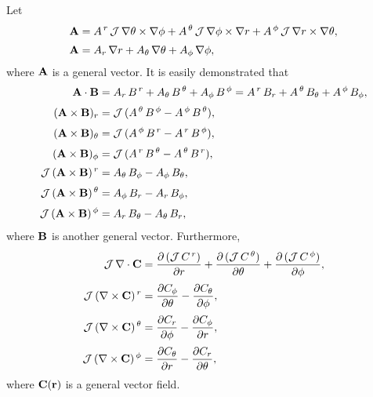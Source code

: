 \documentclass[12pt,prb,aps]{revtex4-1}
\begin{document}
Let
\begin{align}
{\bf A} &= A^{\,r}\,{\cal J}\,\nabla\theta\times\nabla\phi
+  A^{\,\theta}\,{\cal J}\,\nabla\phi\times\nabla r
+  A^{\,\phi}\,{\cal J}\,\nabla r\times\nabla\theta,\\[0.5ex]
{\bf A} &= A_r\,\nabla r+A_\theta\,\nabla\theta+A_\phi\,\nabla\phi,
\end{align}
where ${\bf A}$ is a general vector.
It is easily demonstrated that
\begin{align}
{\bf A}\cdot{\bf B} &= A_r\,B^{\,r}+A_\theta \,B^{\,\theta}+A_\phi\,B^{\,\phi}=A^{\,r}\,B_r+A^{\,\theta}\,B_{\theta}+A^{\,\phi}\,B_\phi,\\[0.5ex]
({\bf A}\times {\bf B})_r &= {\cal J}\,(A^{\,\theta}\,B^{\,\phi}-A^{\,\phi}\,B^{\,\theta}),\label{crossdown1}\\[0.5ex]
({\bf A}\times {\bf B})_\theta &= {\cal J}\,(A^{\,\phi}\,B^{\,r}-A^{\,r}\,B^{\,\phi}),\label{crossdown2}\\[0.5ex]
({\bf A}\times {\bf B})_\phi &= {\cal J}\,(A^{\,r}\,B^{\,\theta}-A^{\,\theta}\,B^{\,r}),\label{crossdown3}\\[0.5ex]
{\cal J}\,({\bf A}\times {\bf B})^{\,r} &= A_{\theta}\,B_{\phi}-A_{\phi}\,B_{\theta},\label{crossup1}\\[0.5ex]
{\cal J}\,({\bf A}\times {\bf B})^{\,\theta} &= A_{\phi}\,B_{r}-A_{r}\,B_{\phi},\\[0.5ex]
{\cal J}\,({\bf A}\times {\bf B})^{\,\phi} &=A_{r}\,B_{\theta}-A_{\theta}\,B_{r},\label{crossup3}
\end{align}
where ${\bf B}$ is another general vector.
Furthermore,
\begin{align}
{\cal J}\,\nabla \cdot{\bf C} &= \frac{\partial\,({\cal J}\,C^{\,r})}{\partial r} + 
\frac{\partial\,({\cal J}\,C^{\,\theta})}{\partial \theta}+ 
\frac{\partial\,({\cal J}\,C^{\,\phi})}{\partial \phi},\label{div}\\[0.5ex]
{\cal J}\,(\nabla\times {\bf C})^{\,r}&= \frac{\partial C_\phi}{\partial \theta}
-\frac{\partial C_\theta}{\partial \phi},\label{curl1}\\[0.5ex]
{\cal J}\,(\nabla\times {\bf C})^{\,\theta}&= \frac{\partial C_r}{\partial \phi}
-\frac{\partial C_\phi}{\partial r},\\[0.5ex]
{\cal J}\,(\nabla\times {\bf C})^{\,\phi}&= \frac{\partial C_\theta}{\partial r}
-\frac{\partial C_r}{\partial \theta},\label{curl3}
\end{align}
where ${\bf C}({\bf r})$ is a general vector field.
\end{document}
